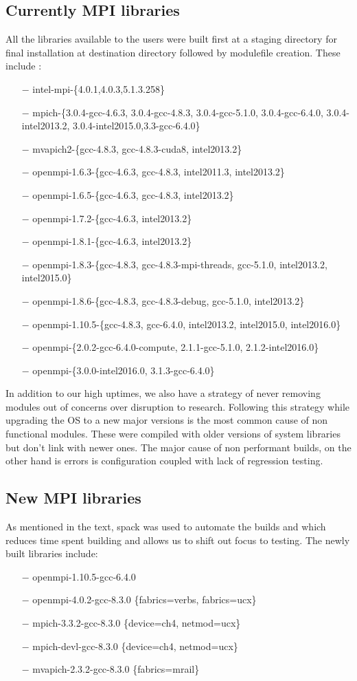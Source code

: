 \documentclass[sigconf,authordraft]{acmart}
\begin{document}
\subsection{Currently MPI libraries}
All the libraries available to the users were built first at a staging directory
for final installation at destination directory followed by modulefile creation. These include :
\begin{itemize}
	\item[$-$] intel-mpi-\{4.0.1,4.0.3,5.1.3.258\}
	\item[$-$] mpich-\{3.0.4-gcc-4.6.3, 3.0.4-gcc-4.8.3, 3.0.4-gcc-5.1.0, 	3.0.4-gcc-6.4.0, 3.0.4-intel2013.2, 3.0.4-intel2015.0,3.3-gcc-6.4.0\}
	\item[$-$]mvapich2-\{gcc-4.8.3, gcc-4.8.3-cuda8, intel2013.2\}
	\item[$-$]openmpi-1.6.3-\{gcc-4.6.3, gcc-4.8.3, intel2011.3, intel2013.2\}
	\item[$-$]openmpi-1.6.5-\{gcc-4.6.3, gcc-4.8.3, intel2013.2\}
	\item[$-$]openmpi-1.7.2-\{gcc-4.6.3, intel2013.2\}		\item[$-$]openmpi-1.8.1-\{gcc-4.6.3, intel2013.2\}
	\item[$-$]openmpi-1.8.3-\{gcc-4.8.3, gcc-4.8.3-mpi-threads, gcc-5.1.0, 	intel2013.2, intel2015.0\}
	\item[$-$]openmpi-1.8.6-\{gcc-4.8.3, gcc-4.8.3-debug, gcc-5.1.0, intel2013.2\}
	\item[$-$]openmpi-1.10.5-\{gcc-4.8.3, gcc-6.4.0, intel2013.2, intel2015.0, intel2016.0\}
	\item[$-$]openmpi-\{2.0.2-gcc-6.4.0-compute, 2.1.1-gcc-5.1.0, 2.1.2-intel2016.0\}
	\item[$-$]openmpi-\{3.0.0-intel2016.0, 3.1.3-gcc-6.4.0\}
\end{itemize} 
In addition to our high uptimes, we also have a strategy of never removing modules out of concerns over disruption to research. Following this strategy while upgrading the OS to a new major versions is the most common cause of non functional modules. These were compiled with older versions of system libraries but don't link with newer ones. The major cause of non performant builds, on the other hand is errors is configuration coupled with lack of regression testing.

\subsection{New MPI libraries}
As mentioned in the text, spack\cite{spack} was used to automate the builds and which reduces time spent building and allows us to shift out focus to testing.
The newly built libraries include:
\begin{itemize}
	\item[$-$] openmpi-1.10.5-gcc-6.4.0
	\item[$-$] openmpi-4.0.2-gcc-8.3.0 \{fabrics=verbs, fabrics=ucx\}
	\item[$-$] mpich-3.3.2-gcc-8.3.0 \{device=ch4, netmod=ucx\}
	\item[$-$] mpich-devl-gcc-8.3.0 \{device=ch4, netmod=ucx\}
	\item[$-$] mvapich-2.3.2-gcc-8.3.0 \{fabrics=mrail\}
\end{itemize} 
\end{document}
